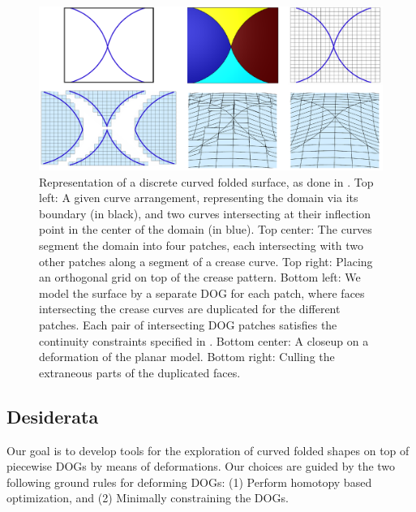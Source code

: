 \begin{figure} [t]
	\centering
	\includegraphics[width=\linewidth]{figures/dogs_from_creases}
	\caption{Representation of a discrete curved folded surface, as done in \cite{rabi18}. Top left: A given curve arrangement, representing the domain via its boundary (in black), and two curves intersecting at their inflection point in the center of the domain (in blue). Top center: The curves segment the domain into four patches, each intersecting with two other patches along a segment of a crease curve. Top right: Placing an orthogonal grid on top of the crease pattern. Bottom left: We model the surface by  a separate DOG for each patch, where faces intersecting the crease curves are duplicated for the different patches. Each pair of intersecting DOG patches satisfies the continuity constraints specified in \cite{rabi18}. Bottom center: A closeup on a deformation of the planar model. Bottom right: Culling the extraneous parts of the duplicated faces.}
	\label{fig:dogs_from_creases}
	
	
\end{figure}

\subsection{Desiderata}
Our goal is to develop tools for the exploration of curved folded shapes on top of piecewise DOGs by means of deformations. Our choices are guided by the two following ground rules for deforming DOGs:
(1) Perform homotopy based optimization, and 
(2) Minimally constraining the DOGs.

